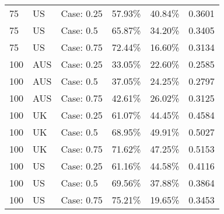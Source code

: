 \begin{table}[ht]
\begin{tabular}{llllll}
  75 & US & Case: 0.25 & 57.93\% & 40.84\% & 0.3601 \\ 
  75 & US & Case: 0.5 & 65.87\% & 34.20\% & 0.3405 \\ 
  75 & US & Case: 0.75 & 72.44\% & 16.60\% & 0.3134 \\ 
  100 & AUS & Case: 0.25 & 33.05\% & 22.60\% & 0.2585 \\ 
  100 & AUS & Case: 0.5 & 37.05\% & 24.25\% & 0.2797 \\ 
  100 & AUS & Case: 0.75 & 42.61\% & 26.02\% & 0.3125 \\ 
  100 & UK & Case: 0.25 & 61.07\% & 44.45\% & 0.4584 \\ 
  100 & UK & Case: 0.5 & 68.95\% & 49.91\% & 0.5027 \\ 
  100 & UK & Case: 0.75 & 71.62\% & 47.25\% & 0.5153 \\ 
  100 & US & Case: 0.25 & 61.16\% & 44.58\% & 0.4116 \\ 
  100 & US & Case: 0.5 & 69.56\% & 37.88\% & 0.3864 \\ 
  100 & US & Case: 0.75 & 75.21\% & 19.65\% & 0.3453 \\ 
   \hline
\end{tabular}
\end{table}
